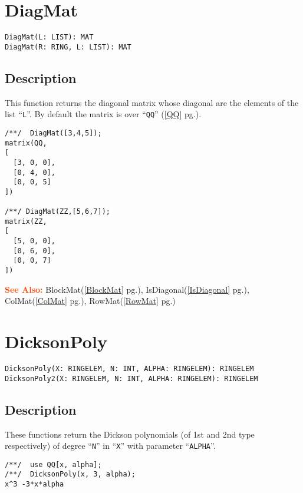 \documentclass[a4paper]{mybook}
\newenvironment{command}{}{} %
\newcommand\SeeAlso{\par\textcolor{OrangeRed}{\textbf{\large See Also: }}}
\begin{document}
\section{DiagMat}
\label{DiagMat}
\begin{command} %


\begin{Verbatim}[label=syntax, rulecolor=\color{MidnightBlue},
frame=single]
DiagMat(L: LIST): MAT
DiagMat(R: RING, L: LIST): MAT
\end{Verbatim}


\subsection*{Description}

This function returns the diagonal matrix whose diagonal are the
elements of the list ``\verb&L&''.  By default the matrix is over ``\verb&QQ&'' (\ref{QQ} pg.\pageref{QQ}).
\begin{Verbatim}[label=example, rulecolor=\color{PineGreen}, frame=single]
/**/  DiagMat([3,4,5]);
matrix(QQ,
[
  [3, 0, 0],
  [0, 4, 0],
  [0, 0, 5]
])

/**/ DiagMat(ZZ,[5,6,7]);
matrix(ZZ,
[
  [5, 0, 0],
  [0, 6, 0],
  [0, 0, 7]
])
\end{Verbatim}


\SeeAlso %
  BlockMat(\ref{BlockMat} pg.\pageref{BlockMat}), 
    IsDiagonal(\ref{IsDiagonal} pg.\pageref{IsDiagonal}), 
    ColMat(\ref{ColMat} pg.\pageref{ColMat}), 
    RowMat(\ref{RowMat} pg.\pageref{RowMat})
\end{command} %

\section{DicksonPoly}
\label{DicksonPoly}
\begin{command} %


\begin{Verbatim}[label=syntax, rulecolor=\color{MidnightBlue},
frame=single]
DicksonPoly(X: RINGELEM, N: INT, ALPHA: RINGELEM): RINGELEM
DicksonPoly2(X: RINGELEM, N: INT, ALPHA: RINGELEM): RINGELEM
\end{Verbatim}


\subsection*{Description}

These functions return the Dickson polynomials (of 1st and 2nd type
respectively) of degree ``\verb&N&'' in ``\verb&X&'' with parameter ``\verb&ALPHA&''.
\begin{Verbatim}[label=example, rulecolor=\color{PineGreen}, frame=single]
/**/  use QQ[x, alpha];
/**/  DicksonPoly(x, 3, alpha);
x^3 -3*x*alpha
\end{Verbatim}


\end{command} %
\end{document}
